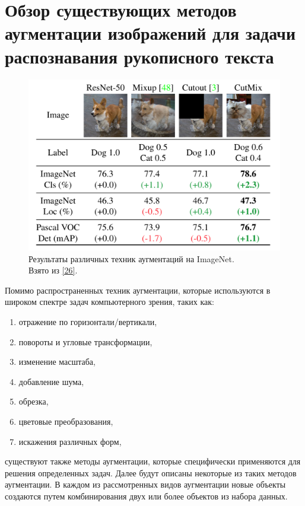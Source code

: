 \section{Обзор существующих методов аугментации изображений для задачи распознавания рукописного текста}
\label{sec:Chapter2} 

\begin{figure}
    \centering
    \includegraphics[scale=0.25]{./images/cutmix.png}
    \caption{\protect\hypertarget{image7}{Результаты различных техник аугментаций на ImageNet. \\ Взято из \protect\hyperlink{cite.Yun19}{[26]}}.}
\end{figure}

Помимо распространенных техник аугментации, которые используются в широком спектре задач компьютерного зрения, таких как:
\begin{enumerate}
\item отражение по горизонтали/вертикали,
\item повороты и угловые трансформации,
\item изменение масштаба,
\item добавление шума,
\item обрезка,
\item цветовые преобразования,
\item искажения различных форм,
\end{enumerate}
существуют также методы аугментации, которые специфически применяются для решения определенных задач. Далее будут описаны некоторые из таких методов аугментации. В каждом из рассмотренных видов аугментации новые объекты создаются путем комбинирования двух или более объектов из набора данных.

